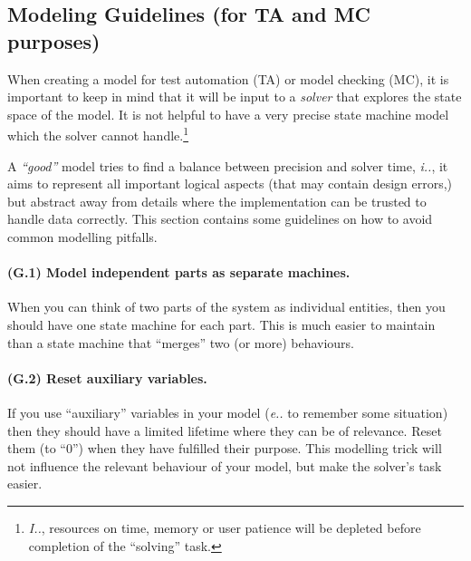 \subsection{Modeling Guidelines (for TA and MC purposes)}\label{sec:modeling.guidelines.TA.MC}
When creating a model for test automation (TA) or model checking (MC), it is
important to keep in mind that it will be input to a {\em solver} that
explores the state space of the model. 
It is not helpful to have a very precise state machine model which the solver
cannot handle.\footnote{\emph{I.\@e.\@}, resources on time, memory or user patience will
  be depleted before completion of the ``solving'' task.} 

A {\em ``good''} model tries to find a balance between precision and solver
time, \emph{i.\@e.\@}, it aims to represent all important logical aspects (that may
contain design errors,) but abstract away from details where the
implementation can be trusted to handle data correctly.
%
This section contains some guidelines on how to avoid common modelling pitfalls.
%
\paragraph{(G.1) Model independent parts as separate machines.}
When you can think of two parts of the system as individual entities, then
you should have one state machine for each part. This is much easier to
maintain than a state machine that ``merges'' two (or more) behaviours.
%
\paragraph{(G.2) Reset auxiliary variables.}
If you use ``auxiliary'' variables in your model (\emph{e.\@g.\@} to remember some
situation) then they should have a limited lifetime where they can be of
relevance.  Reset them (to ``0'') when they have fulfilled their purpose. This modelling
trick will not influence the relevant behaviour of your model, but make the solver's task easier.
%
